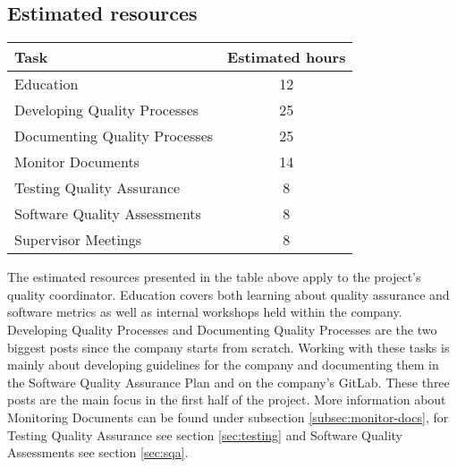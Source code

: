 \subsection{Estimated resources}
\begin{table}[!ht]
\centering
\begin{tabular}{ | l | c |}
    \hline
Task & Estimated hours\\
\hline
Education & 12\\
Developing Quality Processes & 25\\
Documenting Quality Processes & 25\\
Monitor Documents & 14\\
Testing Quality Assurance & 8\\
Software Quality Assessments & 8\\
Supervisor Meetings & 8\\
\hline
\end{tabular}
\end{table}
\noindent The estimated resources presented in the table above apply to the project's quality coordinator. Education covers both learning about quality assurance and software metrics as well as internal workshops held within the company. Developing Quality Processes and Documenting Quality Processes are the two biggest posts since the company starts from scratch. Working with these tasks is mainly about developing guidelines for the company and documenting them in the Software Quality Assurance Plan and on the company's GitLab. These three posts are the main focus in the first half of the project. More information about Monitoring Documents can be found under subsection \ref{subsec:monitor-docs}, for Testing Quality Assurance see section \ref{sec:testing} and Software Quality Assessments see section \ref{sec:sqa}.



